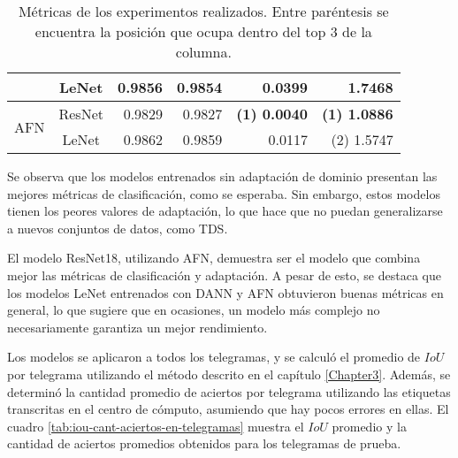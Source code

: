 \begin{table}[H]
\begin{tabular}{cc|rr|rr}
                                     & LeNet  & 0.9856                              & 0.9854                              & 0.0399                              & 1.7468                              \\\hline
        \multirow[c]{2}{*}{AFN}      & ResNet & 0.9829                              & 0.9827                              & \textbf{{\footnotesize (1)} 0.0040} & \textbf{{\footnotesize (1)} 1.0886} \\
                                     & LeNet  & 0.9862                              & 0.9859                              & 0.0117                              & {\footnotesize (2)} 1.5747          \\

        \bottomrule
    \end{tabular}
    \caption[Métricas de los experimentos realizados]{Métricas de los experimentos realizados. Entre paréntesis se encuentra la posición que ocupa dentro del top 3 de la columna.}
    \label{tab:metricas-experimentos}
\end{table}

Se observa que los modelos entrenados sin adaptación de dominio presentan las mejores métricas de clasificación, como
se esperaba. Sin embargo, estos modelos tienen los peores valores de adaptación, lo que hace que no puedan
generalizarse a nuevos conjuntos de datos, como TDS.

El modelo ResNet18, utilizando AFN, demuestra ser el modelo que combina mejor las métricas de clasificación y
adaptación. A pesar de esto, se destaca que los modelos LeNet entrenados con DANN y AFN obtuvieron buenas métricas en
general, lo que sugiere que en ocasiones, un modelo más complejo no necesariamente garantiza un mejor rendimiento.

Los modelos se aplicaron a todos los telegramas, y se calculó el promedio de $IoU$ por telegrama utilizando el método
descrito en el capítulo \ref{Chapter3}. Además, se determinó la cantidad promedio de aciertos por telegrama utilizando
las etiquetas transcritas en el centro de cómputo, asumiendo que hay pocos errores en ellas. El cuadro
\ref{tab:iou-cant-aciertos-en-telegramas} muestra el $IoU$ promedio y la cantidad de aciertos promedios obtenidos para
los telegramas de prueba.

